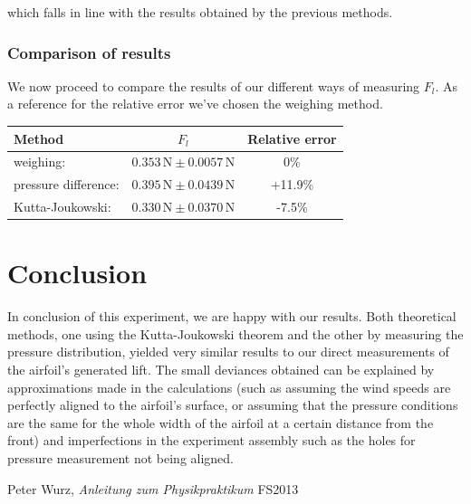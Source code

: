 \documentclass{scrreprt}
\newcommand{\unit}[1]{\ensuremath{\, \mathrm{#1}}}
\begin{document}
which falls in line with the results obtained by the previous methods.

\subsubsection{Comparison of results}

We now proceed to compare the results of our different ways of measuring $F_l$. As a reference for the relative error we've chosen the weighing method.
\begin{table}[H]
\centering
\begin{tabular}{|l|c|c|}
\hline
Method & $F_l$ & Relative error\\
\hline\hline
weighing: & $0.353 \unit{N} \pm 0.0057 \unit{N}$&0\%\\ 
pressure difference: & $0.395 \unit{N} \pm 0.0439 \unit{N}$&+11.9\%\\
Kutta-Joukowski: & $0.330 \unit{N} \pm 0.0370 \unit{N}$&-7.5\%\\
\hline
\end{tabular}
\end{table}


\section{Conclusion}
In conclusion of this experiment, we are happy with our results. Both theoretical methods, one using the Kutta-Joukowski theorem and the other by measuring the pressure distribution, yielded very similar results to our direct measurements of the airfoil's generated lift. The small deviances obtained can be explained by approximations made in the calculations (such as assuming the wind speeds are perfectly aligned to the airfoil's surface, or assuming that the pressure conditions are the same for the whole width of the airfoil at a certain distance from the front) and imperfections in the experiment assembly such as the holes for pressure measurement not being aligned.

\begin{thebibliography}{9}

  Peter Wurz,
  \emph{Anleitung zum Physikpraktikum}
  FS2013

\end{thebibliography}
\end{document}
